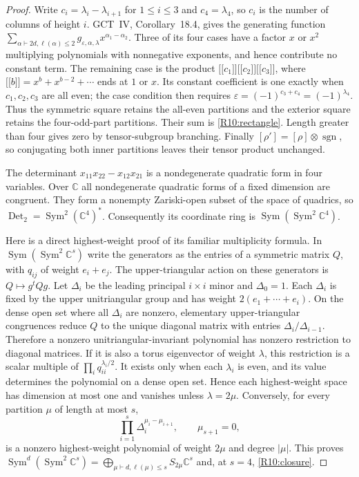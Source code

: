 \documentclass[11pt,a4paper]{article}
\providecommand{\llbracket}{\mathopen{[\![}}
\providecommand{\rrbracket}{\mathclose{]\!]}}
\theoremstyle{definition}\newtheorem{definition}{Definition}
\begin{document}
\begin{proof}
Write $c_i=\lambda_i-\lambda_{i+1}$ for $1\leq i\leq3$ and
$c_4=\lambda_4$, so $c_i$ is the number of columns of height $i$.
GCT~IV, Corollary~18.4, gives the generating function
$\sum_{\alpha\vdash2d,\ell(\alpha)\leq2}
g_{\varepsilon,\alpha,\lambda}x^{\alpha_1-\alpha_2}$.
Three of its four cases have a factor $x$ or $x^2$ multiplying
polynomials with nonnegative exponents, and hence contribute no
constant term. The remaining case is the product
$\llbracket c_1\rrbracket\llbracket c_2\rrbracket
\llbracket c_3\rrbracket$, where
$\llbracket b\rrbracket=x^b+x^{b-2}+\cdots$ ends at $1$ or $x$.
Its constant coefficient is one exactly when $c_1,c_2,c_3$ are all
even; the case condition then requires
$\varepsilon=(-1)^{c_3+c_4}=(-1)^{\lambda_4}$.
Thus the symmetric square retains the all-even partitions and the
exterior square retains the four-odd-part partitions. Their sum is
\eqref{R10:rectangle}. Length greater than four gives zero by
tensor-subgroup branching. Finally
$[\rho']=[\rho]\otimes\operatorname{sgn}$, so conjugating both
inner partitions leaves their tensor product unchanged.

The determinant $x_{11}x_{22}-x_{12}x_{21}$ is a nondegenerate
quadratic form in four variables. Over $\mathbb C$ all nondegenerate
quadratic forms of a fixed dimension are congruent. They form a
nonempty Zariski-open subset of the space of quadrics, so
$\operatorname{Det}_2=\operatorname{Sym}^2(\mathbb C^4)^*$.
Consequently its coordinate ring is
$\operatorname{Sym}(\operatorname{Sym}^2\mathbb C^4)$.

Here is a direct highest-weight proof of its familiar multiplicity
formula. In $\operatorname{Sym}(\operatorname{Sym}^2\mathbb C^s)$
write the generators as the entries of a symmetric matrix $Q$,
with $q_{ij}$ of weight $e_i+e_j$. The upper-triangular action on
these generators is $Q\mapsto g^tQg$.
Let $\Delta_i$ be the leading principal $i\times i$ minor and
$\Delta_0=1$. Each $\Delta_i$ is fixed by the upper unitriangular
group and has weight $2(e_1+\cdots+e_i)$.
On the dense open set where all $\Delta_i$ are nonzero, elementary
upper-triangular congruences reduce $Q$ to the unique diagonal
matrix with entries $\Delta_i/\Delta_{i-1}$.
Therefore a nonzero unitriangular-invariant polynomial has nonzero
restriction to diagonal matrices. If it is also a torus eigenvector
of weight $\lambda$, this restriction is a scalar multiple of
$\prod_i q_{ii}^{\lambda_i/2}$. It exists only when each
$\lambda_i$ is even, and its value determines the polynomial on a
dense open set. Hence each highest-weight space has dimension at
most one and vanishes unless $\lambda=2\mu$.
Conversely, for every partition $\mu$ of length at most $s$,
\[
 \prod_{i=1}^s\Delta_i^{\mu_i-\mu_{i+1}},\qquad\mu_{s+1}=0,
\]
is a nonzero highest-weight polynomial of weight $2\mu$ and
degree $|\mu|$. This proves
$\operatorname{Sym}^d(\operatorname{Sym}^2\mathbb C^s)
=\bigoplus_{\mu\vdash d,\ell(\mu)\leq s}S_{2\mu}\mathbb C^s$
and, at $s=4$, \eqref{R10:closure}.
\end{proof}
\end{document}

